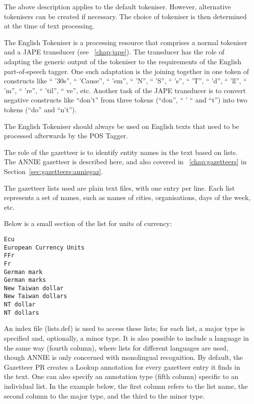 The above description applies to the default tokeniser. However,
alternative tokenisers can be created if necessary. The choice of
tokeniser is then determined at the time of text processing.


The English Tokeniser is a processing resource that comprises a normal
tokeniser and a JAPE transducer (see \Chapthing~\ref{chap:jape}). The
transducer has the role of adapting the generic output of the
tokeniser to the requirements of the English part-of-speech
tagger. One such adaptation is the joining together in one token of
constructs like `` '30s'', `` 'Cause'', `` 'em'', `` 'N'', `` 'S'', ``
's'', `` 'T'', `` 'd'', `` 'll'', `` 'm'', `` 're'', `` 'til'', ``
ve'', etc. Another task of the JAPE transducer is to convert negative
constructs like ``don't'' from three tokens (``don'', `` ' `` and
``t'') into two tokens (``do'' and ``n't'').

The English Tokeniser should always be used on English texts that need
to be processed afterwards by the POS Tagger.



The role of the gazetteer is to identify entity names in the text based on
lists. The ANNIE gazetteer is described here, and also covered in
\Chapthing~\ref{chap:gazetteers} in Section~\ref{sec:gazetteers:anniegaz}.

The gazetteer lists used are plain text files, with one entry per
line. Each list represents a set of names, such as names
of cities, organisations, days of the week, etc.

Below is a small section of the list for units of currency:
\begin{small}
\begin{verbatim}
Ecu
European Currency Units
FFr
Fr
German mark
German marks
New Taiwan dollar
New Taiwan dollars
NT dollar
NT dollars
\end{verbatim}
\end{small}

An index file (lists.def) is used to access these lists; for each list, a
major type is specified and, optionally, a minor type. It is also
possible to include a language in the same way (fourth column), 
where lists for different languages are used, though ANNIE is 
only concerned with monolingual recognition.  By default, the 
Gazetteer PR creates a Lookup annotation for every gazetteer
entry it finds in the text.  One can also specify an annotation type
(fifth column) specific to an individual list.  In the example below, 
the first column refers to the list name, the second column to the
major type, and the third to the minor type.

